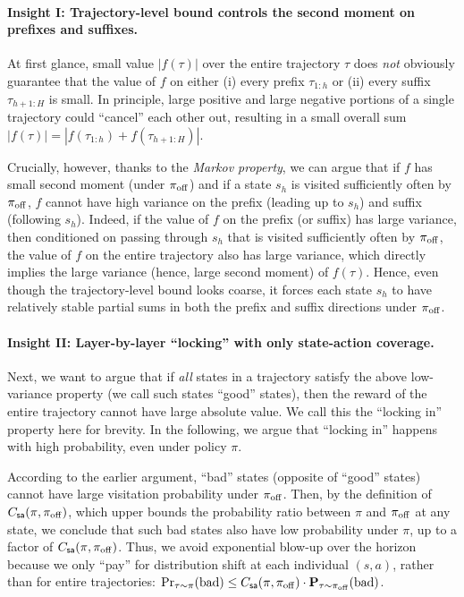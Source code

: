 \documentclass{article}
\let\oldparagraph\paragraph
\renewcommand{\paragraph}[1]{\oldparagraph{#1.}}
\begin{document}
\paragraph{Insight I: Trajectory-level bound controls the second moment on prefixes and suffixes}
At first glance, small value $\bigl\lvert f(\tau)\bigr\rvert$ over the entire trajectory $\tau$ does \emph{not} obviously guarantee that the value of $f$ on either (i) every prefix $\tau_{1:h}$ or (ii) every suffix $\tau_{h+1:H}$ is small. In principle, large positive and large negative portions of a single trajectory could ``cancel'' each other out, resulting in a small overall sum $|f(\tau)|=|f(\tau_{1:h})+f(\tau_{h+1:H})|$.

Crucially, however, thanks to the \emph{Markov property}, we can argue that if $f$ has small second moment (under $\pi_{\mathrm{off}}$) and if a state $s_h$ is visited sufficiently often by $\pi_{\mathrm{off}}$, $f$ cannot have high variance on the prefix (leading up to $s_h$) and suffix (following $s_h$).
Indeed, if the value of $f$ on the prefix (or suffix) has large variance, then conditioned on passing through $s_h$ that is visited sufficiently often by $\pi_{\mathrm{off}}$, the value of $f$ on the entire trajectory also has large variance, which directly implies the large variance (hence, large second moment) of $f(\tau)$. 
Hence, even though the trajectory-level bound looks coarse, it forces each state $s_h$ to have relatively stable partial sums in both the prefix and suffix directions under $\pi_{\mathrm{off}}$.

\paragraph{Insight II: Layer-by-layer ``locking'' with only state-action coverage}
Next, we want to argue that if \emph{all} states in a trajectory satisfy the above low-variance property (we call such states ``good'' states), then the reward of the entire trajectory cannot have large absolute value. We call this the ``locking in'' property here for brevity. In the following, we argue that ``locking in'' happens with high probability, even under policy $\pi$.

According to the earlier argument, ``bad'' states (opposite of ``good'' states) cannot have large visitation probability under $\pi_{\mathrm{off}}$. Then, by the definition of $C_{\mathsf{sa}}(\pi, \pi_{\mathrm{off}})$, which upper bounds the probability ratio between $\pi$ and $\pi_{\mathrm{off}}$ at any state, we conclude that such bad states also have low probability under $\pi$, up to a factor of $C_{\mathsf{sa}}(\pi,\pi_{\mathrm{off}})$. Thus, we avoid exponential blow-up over the horizon because we only ``pay'' for distribution shift at each individual $(s,a)$, rather than for entire trajectories:
$\Pr_{\tau \sim \pi}(\text{bad}) \leq C_{\mathsf{sa}}(\pi,\pi_{\mathrm{off}})\cdot\mathbf{P}_{\tau \sim \pi_{\mathrm{off}}}(\text{bad})$.
\end{document}
